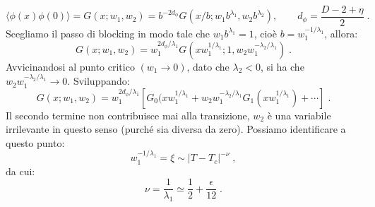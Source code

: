 \documentclass[12pt,a4paper]{article}
\theoremstyle{definition}
\numberwithin{equation}{section}
\newcommand{\bra}{\langle}
\newcommand{\ket}{\rangle}
\begin{document}
\begin{equation}
\bra \phi(x)\phi(0)\ket=G(x;w_1,w_2)=b^{-2d_{\phi}}G(x/b;w_1b^{\lambda_1},w_2b^{\lambda_2}),\qquad d_{\phi}=\frac{D-2+\eta}{2}\;.
\end{equation}
Scegliamo il passo di blocking in modo tale che $w_1b^{\lambda_1}=1$, cioè $b=w_1^{-1/\lambda_1}$, allora:
\begin{equation}
G(x;w_1,w_2)=w_1^{2d_{\phi}/\lambda_1}G(xw_1^{1/\lambda_1};1,w_2w_1^{-\lambda_2/\lambda_1})\;.
\end{equation}
Avvicinandosi al punto critico $(w_1\to 0)$, dato che $\lambda_2<0$, si ha che $w_2w_1^{-\lambda_2/\lambda_1}\to 0$. Sviluppando:
\begin{equation}
\boxed{
G(x;w_1,w_2)=w_1^{2d_{\phi}/\lambda_1}\left[G_0(xw_1^{1/\lambda_1}+w_2w_1^{-\lambda_2/\lambda_1}G_1(xw_1^{1/\lambda_1})+\cdots\right]
}\;.
\end{equation}
Il secondo termine non contribuisce mai alla transizione, $w_2$ è una variabile irrilevante in questo senso (purché sia diversa da zero). Possiamo identificare a questo punto:
\begin{equation}
w_1^{-1/\lambda_1}=\xi\sim |T-T_c|^{-\nu}\;,
\end{equation}
da cui:
\begin{equation}
\boxed{
\nu=\frac{1}{\lambda_1}\simeq \frac{1}{2}+\frac{\epsilon}{12}
}\;.
\end{equation}
\cleardoublepage
\appendix
\end{document}
